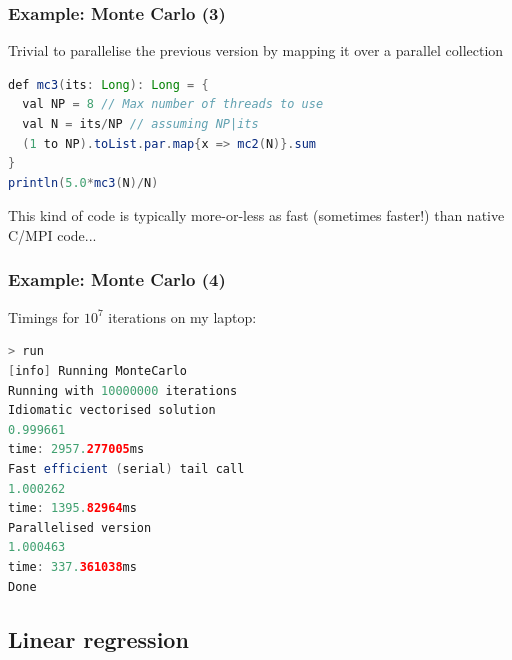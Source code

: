 \documentclass[mathserif,handout]{beamer}
\begin{document}
\begin{frame}[fragile]
\frametitle{Example: Monte Carlo (3)}
Trivial to parallelise the previous version by mapping it over a parallel collection
{\small
\begin{lstlisting}[language=java]
def mc3(its: Long): Long = {
  val NP = 8 // Max number of threads to use
  val N = its/NP // assuming NP|its
  (1 to NP).toList.par.map{x => mc2(N)}.sum
}
println(5.0*mc3(N)/N)
\end{lstlisting}}
This kind of code is typically more-or-less as fast (sometimes faster!) than native C/MPI code...
\end{frame}

\begin{frame}[fragile]
\frametitle{Example: Monte Carlo (4)}
Timings for $10^7$ iterations on my laptop:
{\small
\begin{lstlisting}[language=java]
> run
[info] Running MonteCarlo 
Running with 10000000 iterations
Idiomatic vectorised solution
0.999661
time: 2957.277005ms
Fast efficient (serial) tail call
1.000262
time: 1395.82964ms
Parallelised version
1.000463
time: 337.361038ms
Done
\end{lstlisting}}
\end{frame}



\subsection{Linear regression}

\end{document}

